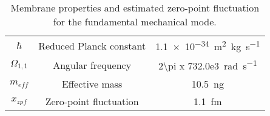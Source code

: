 \begin{table}[H]
\centering
\begin{tabular}{ccc}
\toprule
$\hbar$ & Reduced Planck constant & \SI{1.1e-34}{\square\meter\kilogram\per\second} \\
$\Omega_{1,1}$ & Angular frequency & \SI[product-units=single]{2\pi x 732.0e3}{\radian\per\second} \\
$m_{eff}$ & Effective mass & \SI{10.5}{\nano\gram} \\
\midrule
$x_{zpf}$ & Zero-point fluctuation & \SI{1.1}{\femto\meter} \\
\bottomrule
\end{tabular}
\caption{Membrane properties and estimated zero-point fluctuation for the fundamental mechanical mode.}
\label{tab:zpf_fluctuation}
\end{table}
